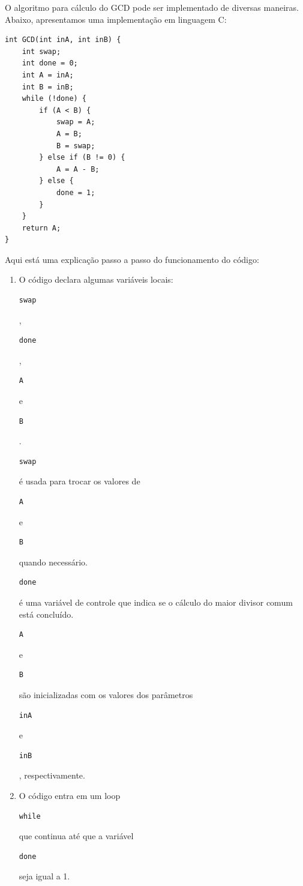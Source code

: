 \documentclass[a4paper,11pt]{article} %
\begin{document}
O algoritmo para cálculo do GCD pode ser implementado de diversas maneiras.
Abaixo, apresentamos uma implementação em linguagem C:

\begin{verbatim}
int GCD(int inA, int inB) {
    int swap;
    int done = 0;
    int A = inA;
    int B = inB;
    while (!done) {
        if (A < B) {
            swap = A;
            A = B;
            B = swap;
        } else if (B != 0) {
            A = A - B;
        } else {
            done = 1;
        }
    }
    return A;
}
\end{verbatim}


Aqui está uma explicação passo a passo do funcionamento do código:

\begin{enumerate}
    \item O código declara algumas variáveis locais: \begin{verbatim}swap\end{verbatim}, \begin{verbatim}done\end{verbatim}, \begin{verbatim}A\end{verbatim} e \begin{verbatim}B\end{verbatim}.
          \begin{verbatim}swap\end{verbatim} é usada para trocar os valores de \begin{verbatim}A\end{verbatim} e \begin{verbatim}B\end{verbatim} quando necessário.
          \begin{verbatim}done\end{verbatim} é uma variável de controle que indica se o cálculo do maior divisor comum está concluído.
          \begin{verbatim}A\end{verbatim} e \begin{verbatim}B\end{verbatim} são inicializadas com os valores dos parâmetros \begin{verbatim}inA\end{verbatim} e \begin{verbatim}inB\end{verbatim}, respectivamente.
    \item O código entra em um loop \begin{verbatim}while\end{verbatim} que continua até que a variável \begin{verbatim}done\end{verbatim} seja igual a 1.

\end{enumerate}
\end{document}
